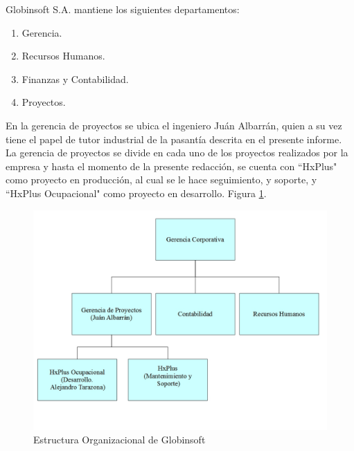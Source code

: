     Globinsoft S.A. mantiene los siguientes departamentos:
    
    \begin{enumerate}
        \item Gerencia.
        \item Recursos Humanos.
        \item Finanzas y Contabilidad.
        \item Proyectos.
    \end{enumerate}
    
    En la gerencia de proyectos se ubica el ingeniero Juán Albarrán, quien a su vez tiene el papel de tutor industrial de la pasantía descrita en el presente informe. La gerencia de proyectos se divide en cada uno de los proyectos realizados por la empresa y hasta el momento de la presente redacción, se cuenta con ``HxPlus" como proyecto en producción, al cual se le hace seguimiento, y soporte, y ``HxPlus Ocupacional" como proyecto en desarrollo. Figura \ref{estructura-org}.
    
    \begin{figure}[htbp!]
        \begin{center}
            \includegraphics[width=.8\textwidth]{figures/Estructura}
        \end{center}
        \caption{Estructura Organizacional de Globinsoft}
        \label{estructura-org}
    \end{figure}

\pagebreak